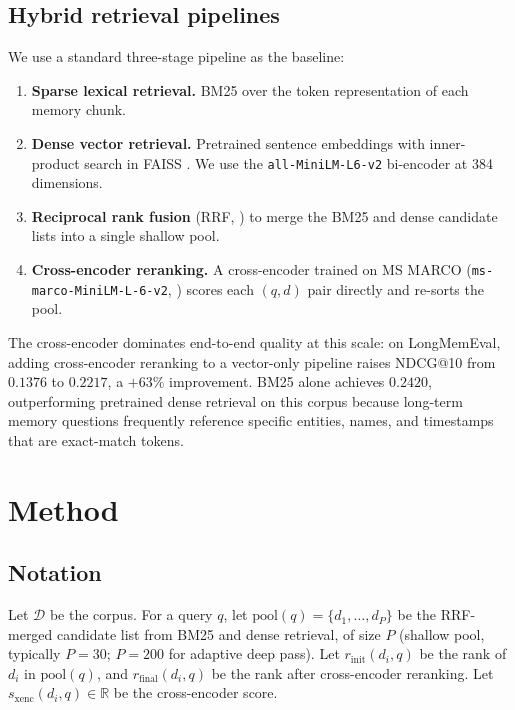 \documentclass[11pt,a4paper]{article}
\begin{document}
\subsection{Hybrid retrieval pipelines}

We use a standard three-stage pipeline as the baseline:

\begin{enumerate}
  \item \textbf{Sparse lexical retrieval.} BM25 \citep{robertson1995okapi} over the token representation of each memory chunk.
  \item \textbf{Dense vector retrieval.} Pretrained sentence embeddings with inner-product search in FAISS \citep{johnson2019faiss}. We use the \texttt{all-MiniLM-L6-v2} bi-encoder \citep{reimers2019sbert} at 384 dimensions.
  \item \textbf{Reciprocal rank fusion} (RRF, \citealp{cormack2009rrf}) to merge the BM25 and dense candidate lists into a single shallow pool.
  \item \textbf{Cross-encoder reranking.} A cross-encoder trained on MS MARCO (\texttt{ms-marco-MiniLM-L-6-v2}, \citealp{nogueira2019msmarco}) scores each $(q, d)$ pair directly and re-sorts the pool.
\end{enumerate}

The cross-encoder dominates end-to-end quality at this scale: on LongMemEval, adding cross-encoder reranking to a vector-only pipeline raises NDCG@10 from $0.1376$ to $0.2217$, a $+63\%$ improvement. BM25 alone achieves $0.2420$, outperforming pretrained dense retrieval on this corpus because long-term memory questions frequently reference specific entities, names, and timestamps that are exact-match tokens.

\section{Method}

\subsection{Notation}

Let $\mathcal{D}$ be the corpus. For a query $q$, let $\mathrm{pool}(q) = \{d_1, \dots, d_P\}$ be the RRF-merged candidate list from BM25 and dense retrieval, of size $P$ (shallow pool, typically $P=30$; $P=200$ for adaptive deep pass). Let $r_{\text{init}}(d_i, q)$ be the rank of $d_i$ in $\mathrm{pool}(q)$, and $r_{\text{final}}(d_i, q)$ be the rank after cross-encoder reranking. Let $s_{\text{xenc}}(d_i, q) \in \mathbb{R}$ be the cross-encoder score.
\end{document}
